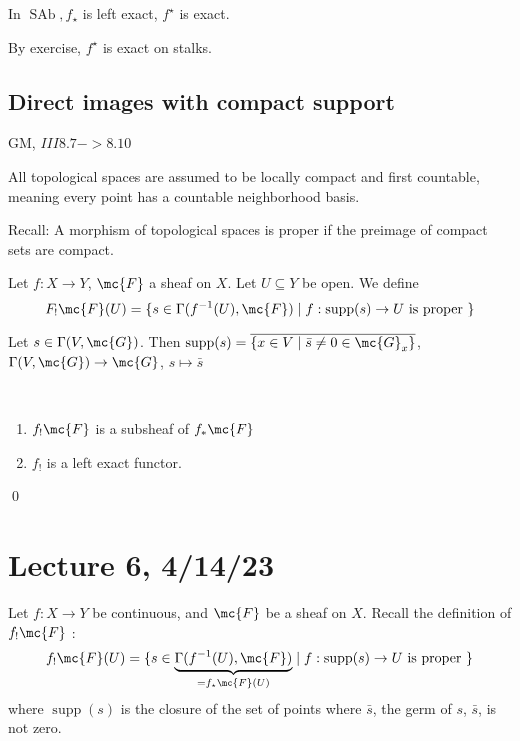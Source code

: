 \documentclass[x11names,reqno,14pt]{extarticle}
\DeclareMathOperator{\supp}{supp}
\DeclareMathOperator{\SAb}{SAb}
\begin{document}
\prop

In $\SAb, f_\star$ is left exact, $f^\star$ is exact. 

\proof 

By exercise, $f^\star$ is exact on stalks.

\subsection*{Direct images with compact support}

GM, $III8.7->8.10$

All topological spaces are assumed to be locally compact and first countable, meaning every point has a countable neighborhood basis. 

Recall: A morphism of topological spaces is proper if the preimage of compact sets are compact. 


Let $f:X\to Y$, $\mc{F}$ a sheaf on $X$. Let $U \subseteq Y$ be open. We define
\[
F_!\mc{F}(U) = \{s \in \Gamma(f^{-1}(U),\mc{F}) \mid f:\operatorname{supp}(s) \to U\text{ is proper }\}
\]


Let $s \in \Gamma(V,\mc{G})$. Then $\supp(s) = \overline{\{x\in V \mid \bar{s} \neq 0 \in \mc{G}_x\}}$, $\Gamma(V, \mc{G}) \to \mc{G}$, $s\mapsto \bar{s}$

\lem\,

\begin{enumerate}[label=(\alph*)]

\item $f_!\mc{F}$ is a subsheaf of $f_*\mc{F}$

\item $f_!$ is a left exact functor.

\end{enumerate}

\proof

\qed



\section*{Lecture 6, 4/14/23}

Let $f:X\to Y$ be continuous, and $\mc{F}$ be a sheaf on $X$. Recall the definition of $f_!\mc{F}$ :
\[
f_!\mc{F}(U) = \{s \in \underbrace{\Gamma(f^{-1}(U),\mc{F})}_{=f_\star\mc{F}(U)} \mid f:\operatorname{supp}(s) \to U\text{ is proper }\}
\]
where $\supp(s)$ is the closure of the set of points where $\bar{s}$, the germ of $s$, $\bar{s}$, is not zero. 
\end{document}
